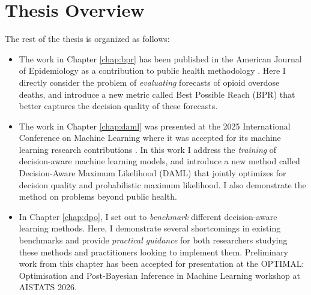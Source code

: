 \section{Thesis Overview}
The rest of the thesis is organized as follows:
\begin{itemize}
    \item The work in Chapter \ref{chap:bpr} has been published in the American Journal of Epidemiology as a contribution to public health methodology \citep{heutonSpatiotemporalForecastingOpioidrelated2024}. Here I directly consider the problem of \emph{evaluating} forecasts of opioid overdose deaths, and introduce a new metric called Best Possible Reach (BPR) that better captures the decision quality of these forecasts.
    \item The work in Chapter \ref{chap:daml} was presented at the 2025 International Conference on Machine Learning where it was accepted for its machine learning research contributions \citep{heuton2025decisionaware}. In this work I address the \emph{training} of decision-aware machine learning models, and introduce a new method called Decision-Aware Maximum Likelihood (DAML) that jointly optimizes for decision quality and probabilistic maximum likelihood. I also demonstrate the method on problems beyond public health.
    \item In Chapter \ref{chap:dpo}, I set out to \emph{benchmark} different decision-aware learning methods. Here, I demonstrate several shortcomings in existing benchmarks and provide \emph{practical guidance} for both researchers studying these methods and practitioners looking to implement them. Preliminary work from this chapter has been accepted for presentation at the OPTIMAL: Optimisation and Post-Bayesian Inference in Machine Learning workshop at AISTATS 2026.
\end{itemize}


